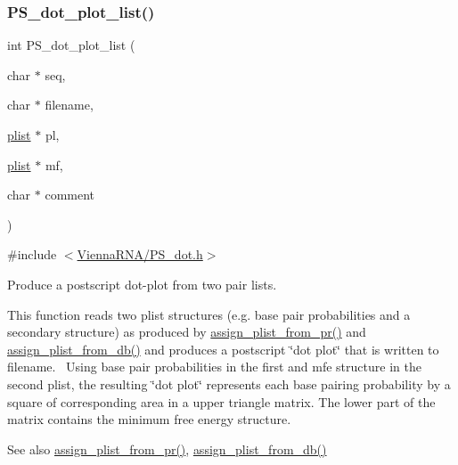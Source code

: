 \subsubsection{\texorpdfstring{P\+S\+\_\+dot\+\_\+plot\+\_\+list()}{PS\_dot\_plot\_list()}}
{\footnotesize\ttfamily int P\+S\+\_\+dot\+\_\+plot\+\_\+list (\begin{DoxyParamCaption}\item[{char $\ast$}]{seq,  }\item[{char $\ast$}]{filename,  }\item[{\hyperlink{group__data__structures_ga9608eed021ebfbdd7a901cfdc446c8e9}{plist} $\ast$}]{pl,  }\item[{\hyperlink{group__data__structures_ga9608eed021ebfbdd7a901cfdc446c8e9}{plist} $\ast$}]{mf,  }\item[{char $\ast$}]{comment }\end{DoxyParamCaption})}



{\ttfamily \#include $<$\hyperlink{PS__dot_8h}{Vienna\+R\+N\+A/\+P\+S\+\_\+dot.\+h}$>$}



Produce a postscript dot-\/plot from two pair lists. 

This function reads two plist structures (e.\+g. base pair probabilities and a secondary structure) as produced by \hyperlink{group__pf__fold_ga1cc05aaa9b0e7df2d3887e98321c2030}{assign\+\_\+plist\+\_\+from\+\_\+pr()} and \hyperlink{group__struct__utils_gab61df77cf7949cd516181fce0c3d7d78}{assign\+\_\+plist\+\_\+from\+\_\+db()} and produces a postscript \char`\"{}dot plot\char`\"{} that is written to \textquotesingle{}filename\textquotesingle{}.~\newline
Using base pair probabilities in the first and mfe structure in the second plist, the resulting \char`\"{}dot plot\char`\"{} represents each base pairing probability by a square of corresponding area in a upper triangle matrix. The lower part of the matrix contains the minimum free energy structure.

\begin{DoxySeeAlso}{See also}
\hyperlink{group__pf__fold_ga1cc05aaa9b0e7df2d3887e98321c2030}{assign\+\_\+plist\+\_\+from\+\_\+pr()}, \hyperlink{group__struct__utils_gab61df77cf7949cd516181fce0c3d7d78}{assign\+\_\+plist\+\_\+from\+\_\+db()}
\end{DoxySeeAlso}

